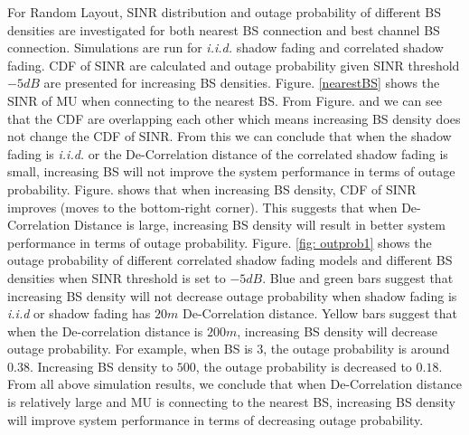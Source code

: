 \par For Random Layout, SINR distribution and outage probability of different BS densities are investigated for both nearest BS connection and best channel BS connection. Simulations are run for \emph{i.i.d.} shadow fading and correlated shadow fading. CDF of SINR are calculated and outage probability given SINR threshold $-5dB$ are presented for increasing BS densities. Figure. \ref{nearestBS} shows the SINR of MU when connecting to the nearest BS. From Figure.  and  we can see that the CDF are overlapping each other which means increasing BS density does not change the CDF of SINR. From this we can conclude that when the shadow fading is \emph{i.i.d.} or the De-Correlation distance of the correlated shadow fading is small, increasing BS will not improve the system performance in terms of outage probability. Figure.   shows that when increasing BS density, CDF of SINR improves (moves to the bottom-right corner). This suggests that when De-Correlation Distance is large, increasing BS density will result in better system performance in terms of outage probability. Figure. \ref{fig: outprob1} shows the outage probability of different correlated shadow fading models and different BS densities when SINR threshold is set to $-5dB$. Blue and green bars suggest that increasing BS density will not decrease outage probability when shadow fading is \emph{i.i.d} or shadow fading has $20m$ De-Correlation distance. Yellow bars suggest that when the De-correlation distance is $200m$, increasing BS density will decrease outage probability. For example, when BS is $3$, the outage probability is around $0.38$. Increasing BS density to $500$, the outage probability is decreased to $0.18$. From all above simulation results, we conclude that when De-Correlation distance is relatively large and MU is connecting to the nearest BS, increasing BS density will improve system performance in terms of decreasing outage probability.



